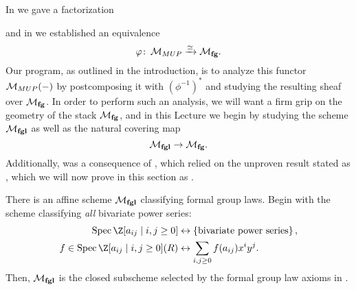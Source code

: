 In  we gave a factorization
\begin{center}
\end{center}
and in  we established an equivalence \[\varphi\colon\thinspace \mathcal{M}_{MUP} \xrightarrow{\simeq} \mathcal{M}_{\mathbf{fg}}.\]  Our program, as outlined in the introduction, is to analyze this functor \(\mathcal{M}_{MUP}(-)\) by postcomposing it with \((\phi^{-1})^*\) and studying the resulting sheaf over \(\mathcal{M}_{\mathbf{fg}}\).  In order to perform such an analysis, we will want a firm grip on the geometry of the stack \(\mathcal{M}_{\mathbf{fg}}\), and in this Lecture we begin by studying the scheme \(\mathcal{M}_{\mathbf{fgl}}\) as well as the natural covering map \[\mathcal{M}_{\mathbf{fgl}} \to \mathcal{M}_{\mathbf{fg}}.\]  Additionally,  was a consequence of , which relied on the unproven result stated as , which we will now prove in this section as .

\begin{definition}\label{MfglDefn}
There is an affine scheme \(\mathcal{M}_{\mathbf{fgl}}\) classifying formal group laws.  Begin with the scheme classifying \emph{all} bivariate power series:
\begin{align*}
\Spec \Z[a_{ij} \mid i, j \ge 0] & \leftrightarrow \left\{ \text{bivariate power series} \right\}, \\
f \in \Spec\Z[a_{ij} \mid i, j \ge 0](R) & \leftrightarrow \sum_{i, j \ge 0} f(a_{ij}) x^i y^j.
\end{align*}
Then, \(\mathcal{M}_{\mathbf{fgl}}\) is the closed subscheme selected by the formal group law axioms in .
\end{definition}

